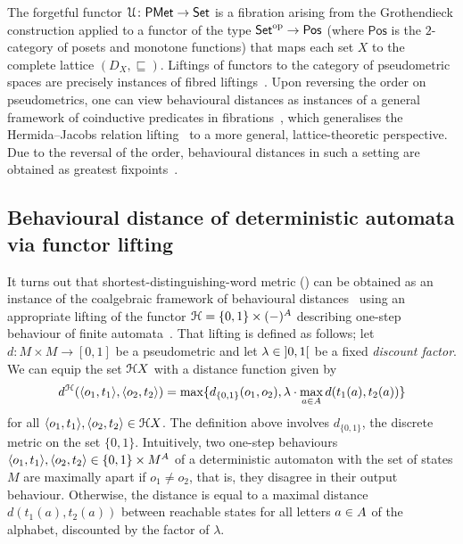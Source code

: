 \begin{remark}
The forgetful functor $\mathcal{U} \colon \mathsf{PMet} \to {\mathsf{Set}}$ is a fibration arising from the Grothendieck construction applied to a functor of the type ${\mathsf{Set}}^{\text{op}} \to \mathsf{Pos}$ (where $\mathsf{Pos}$ is the $2$-category of posets and monotone functions) that maps each set $X$ to the complete lattice $(D_X, \sqsubseteq)$. Liftings of functors to the category of pseudometric spaces are precisely instances of fibred liftings~\cite{Angelo:2024:Behavioural}. Upon reversing the order on pseudometrics, one can view behavioural distances as instances of a general framework of coinductive predicates in fibrations~\cite{Hasuo:2018:Coinductive,Sprunger:2021:Fibrational}, which generalises the Hermida–Jacobs relation lifting~\cite{Hermida:1998:Structural} to a more general, lattice-theoretic perspective. Due to the reversal of the order, behavioural distances in such a setting are obtained as greatest fixpoints~\cite{Bonchi:2018:UpTo}.
\end{remark}
\subsection{Behavioural distance of deterministic automata via functor lifting}	
It turns out that shortest-distinguishing-word metric () can be obtained as an instance of the coalgebraic framework of behavioural distances~\cite[Example~6.5]{Baldan:2018:Coalgebraic} using an appropriate lifting of the functor $\mathcal{H} = \{0,1\} \times (-)^{A}$ describing one-step behaviour of finite automata~\cite[Example~6.3]{Baldan:2018:Coalgebraic}. That lifting is defined as follows; let $d \colon M \times M \to [0,1]$ be a pseudometric and let $\lambda \in \interval[open]{0}{1}$ be a fixed \emph{discount factor}. We can equip the set $\mathcal{H} X$ with a distance function given by
\[
	d^{\mathcal{H}}(\langle o_1, t_1 \rangle, \langle o_2, t_2 \rangle) = \max\{d_{\{0,1\}}(o_1, o_2), \lambda \cdot \max_{a \in {A}} d(t_1(a), t_2(a))\} 
\]   
for all $\langle o_1, t_1 \rangle, \langle o_2, t_2 \rangle \in \mathcal{H} X$. The definition above involves $d_{\{0,1\}}$, the discrete metric on the set $\{0,1\}$. Intuitively, two one-step behaviours $\langle o_1, t_1\rangle, \langle o_2, t_2 \rangle \in \{0,1\} \times M^{A}$ of a deterministic automaton with the set of states $M$ are maximally apart if $o_1 \neq o_2$, that is, they disagree in their output behaviour. Otherwise, the distance is equal to a maximal distance $d(t_1(a), t_2(a))$ between reachable states for all letters $a \in {A}$ of the alphabet, discounted by the factor of $\lambda$.

